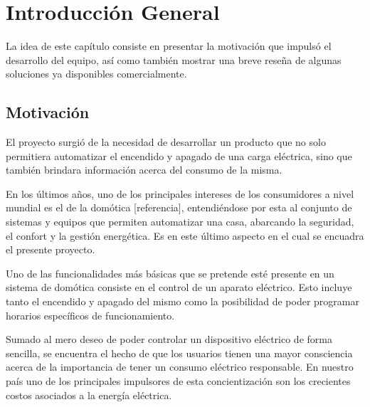 
\chapter{Introducción General} %

\label{Chapter1} %
\label{IntroGeneral}


\newcommand{\keyword}[1]{\textbf{#1}}
\newcommand{\tabhead}[1]{\textbf{#1}}
\newcommand{\code}[1]{\texttt{#1}}
\newcommand{\file}[1]{\texttt{\bfseries#1}}
\newcommand{\option}[1]{\texttt{\itshape#1}}
\newcommand{\grados}{$^{\circ}$}

La idea de este capítulo consiste en presentar la motivación que impulsó el desarrollo del equipo, así como también mostrar una breve reseña de algunas soluciones ya disponibles comercialmente.

\section{Motivación}

El proyecto surgió de la necesidad de desarrollar un producto que no solo permitiera automatizar el encendido y apagado de una carga eléctrica, sino que también brindara información acerca del consumo de la misma.

En los últimos años, uno de los principales intereses de los consumidores a nivel mundial es el de la domótica [referencia], entendiéndose por esta al conjunto de sistemas y equipos que permiten automatizar una casa, abarcando la seguridad, el confort y la gestión energética. Es en este último aspecto en el cual se encuadra el presente proyecto.

Uno de las funcionalidades más básicas que se pretende esté presente en un sistema de domótica consiste en el control de un aparato eléctrico. Esto incluye tanto el encendido y apagado del mismo como la posibilidad de poder programar horarios específicos de funcionamiento.

Sumado al mero deseo de poder controlar un dispositivo eléctrico de forma sencilla, se encuentra el hecho de que los usuarios tienen una mayor consciencia acerca de la importancia de tener un consumo eléctrico responsable. En nuestro país uno de los principales impulsores de esta concientización son los crecientes costos asociados a la energía eléctrica.

